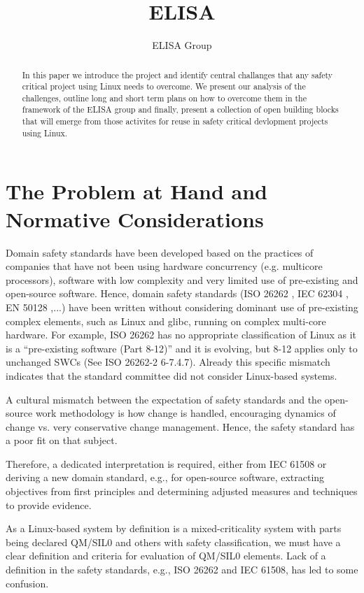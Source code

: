 \documentclass[12pt]{ElisaPaper}
\title{ELISA}
\author{ELISA Group}
\begin{document}
	
\maketitle	
\begin{abstract}
In this paper we introduce the project and identify central challanges that any safety critical project using Linux needs to overcome.
We present our analysis of the challenges, outline long and short term plans on how to overcome them in the framework of the ELISA group and finally, present a collection of open building blocks that will emerge from those activites for reuse in safety critical devlopment projects using Linux.
\end{abstract}

\tableofcontents

\section{The Problem at Hand and Normative Considerations}
Domain safety standards have been developed based on the practices of companies that have not been using hardware concurrency (e.g. multicore processors), software with low complexity and very limited use of pre-existing and open-source software. Hence, domain safety standards (ISO 26262 \cite{ISO26262:2018}, IEC 62304 \cite{IEC62304}, EN 50128 \cite{DINEN50128},...) have been written without considering dominant use of pre-existing complex elements, such as Linux and glibc, running on complex multi-core hardware. For example, ISO 26262 has no appropriate classification of Linux as it is a “pre-existing software  (Part 8-12)” and it is evolving, but 8-12 applies only to unchanged SWCs (See ISO 26262-2 6-7.4.7). Already this specific mismatch indicates that the standard committee did not consider Linux-based systems.

A cultural mismatch between the expectation of safety standards and the open-source work methodology is how change is handled, encouraging dynamics of change vs. very conservative change management. Hence, the safety standard has a poor fit on that subject. 

Therefore, a dedicated interpretation is required, either from IEC 61508 or deriving a new domain standard, e.g., for open-source software, extracting objectives from first principles and determining adjusted measures and techniques to provide evidence.

As a Linux-based system by definition is a mixed-criticality system with parts being declared QM/SIL0 and others with safety classification, we must have a clear definition and criteria for evaluation of QM/SIL0 elements. Lack of a definition in the safety standards, e.g., ISO 26262 and IEC 61508, has led to some confusion.
\end{document}
